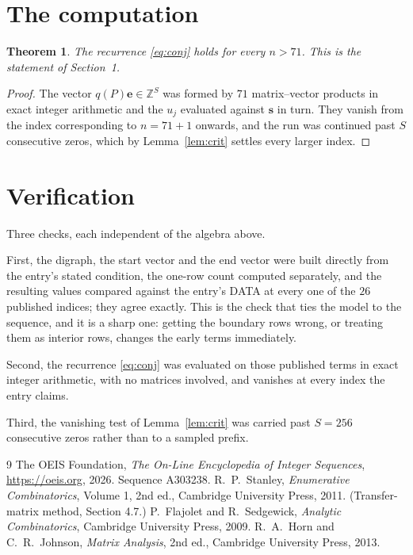 \documentclass[11pt,a4paper]{article}
\theoremstyle{plain}
\newtheorem{theorem}{Theorem}
\theoremstyle{definition}
\begin{document}
\section{The computation}

\begin{theorem}
The recurrence \eqref{eq:conj} holds for every $n>71$. This is the statement of
Section~1.
\end{theorem}

\begin{proof}
The vector $q(P)\mathbf{e}\in\mathbb{Z}^{S}$ was formed by $71$ matrix--vector
products in exact integer arithmetic and the $u_j$ evaluated against $\mathbf{s}$ in turn.
They vanish from the index corresponding to $n=71+1$ onwards, and the run was continued
past $S$ consecutive zeros, which by Lemma~\ref{lem:crit} settles every larger index.
\end{proof}

\section{Verification}

Three checks, each independent of the algebra above.

First, the digraph, the start vector and the end vector were built directly from the
entry's stated condition, the one-row count computed separately, and the resulting values
compared against the entry's DATA at every one of the $26$ published indices; they
agree exactly. This is the check that ties the model to the sequence, and it is a sharp one:
getting the boundary rows wrong, or treating them as interior rows, changes the early terms
immediately.

Second, the recurrence \eqref{eq:conj} was evaluated on those published terms in exact
integer arithmetic, with no matrices involved, and vanishes at every index the entry claims.

Third, the vanishing test of Lemma~\ref{lem:crit} was carried past $S=256$ consecutive
zeros rather than to a sampled prefix.

\begin{thebibliography}{9}
 The OEIS Foundation, \emph{The On-Line Encyclopedia of Integer
Sequences}, \url{https://oeis.org}, 2026. Sequence A303238.
 R.~P.~Stanley, \emph{Enumerative Combinatorics}, Volume 1, 2nd ed.,
Cambridge University Press, 2011. (Transfer-matrix method, Section 4.7.)
 P.~Flajolet and R.~Sedgewick, \emph{Analytic Combinatorics}, Cambridge
University Press, 2009.
 R.~A.~Horn and C.~R.~Johnson, \emph{Matrix Analysis}, 2nd ed., Cambridge
University Press, 2013.
\end{thebibliography}
\end{document}
